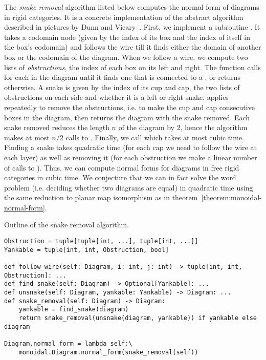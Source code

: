 The \emph{snake removal} algorithm listed below computes the normal form of diagrams in rigid categories.
It is a concrete implementation of the abstract algorithm described in pictures by Dunn and Vicary~\cite[2.12]{DunnVicary19}.
First, we implement a subroutine .
It takes a codomain node (given by the index  of its box and the index  of itself in the box's codomain)
and follows the wire till it finds either the domain of another box or the codomain of the diagram.
When we follow a wire, we compute two lists of \emph{obstructions}, the index of each box on its left and right.
The  function calls  for each  in the diagram until it finds one that is connected to a , or returns  otherwise.
A  snake is given by the index of its cup and cap, the two lists of obstructions on each side and whether it is a left or right snake.
 applies  repeatedly to remove the obstructions, i.e. to make the cup and cap consecutive boxes in the diagram, then returns the diagram with the snake removed.
Each snake removed reduces the length $n$ of the diagram by 2, hence the  algorithm makes at most $n / 2$ calls to .
Finally, we call  which takes at most cubic time.
Finding a snake takes quadratic time (for each cap we need to follow the wire at each layer) as well as removing it (for each obstruction we make a linear number of calls to ).
Thus, we can compute normal forms for diagrams in free rigid categories in cubic time.
We conjecture that we can in fact solve the word problem (i.e. deciding whether two diagrams are equal) in quadratic time using the same reduction to planar map isomorphism as in theorem~\ref{theorem:monoidal-normal-form}.

\begin{python}\label{listing:snake-removal}
{\normalfont Outline of the snake removal algorithm.}

\begin{verbatim}
Obstruction = tuple[tuple[int, ...], tuple[int, ...]]
Yankable = tuple[int, int, Obstruction, bool]

def follow_wire(self: Diagram, i: int, j: int) -> tuple[int, int, Obstruction]: ...
def find_snake(self: Diagram) -> Optional[Yankable]: ...
def unsnake(self: Diagram, yankable: Yankable) -> Diagram: ...
def snake_removal(self: Diagram) -> Diagram:
    yankable = find_snake(diagram)
    return snake_removal(unsnake(diagram, yankable)) if yankable else diagram

Diagram.normal_form = lambda self:\
    monoidal.Diagram.normal_form(snake_removal(self))
\end{verbatim}
\end{python}

